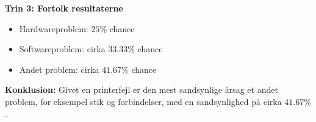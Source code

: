 \begin{solution}
\textbf{Trin 3: Fortolk resultaterne}
\begin{itemize}
    \item Hardwareproblem: $25 \%$ chance
    \item Softwareproblem: cirka $33.33 \%$ chance
    \item Andet problem: cirka $41.67 \%$ chance
\end{itemize}

\textbf{Konklusion:} Givet en printerfejl er den mest sandsynlige årsag et andet problem, for eksempel stik og forbindelser, med en sandsynlighed på cirka $41.67 \%$.


\end{solution}
